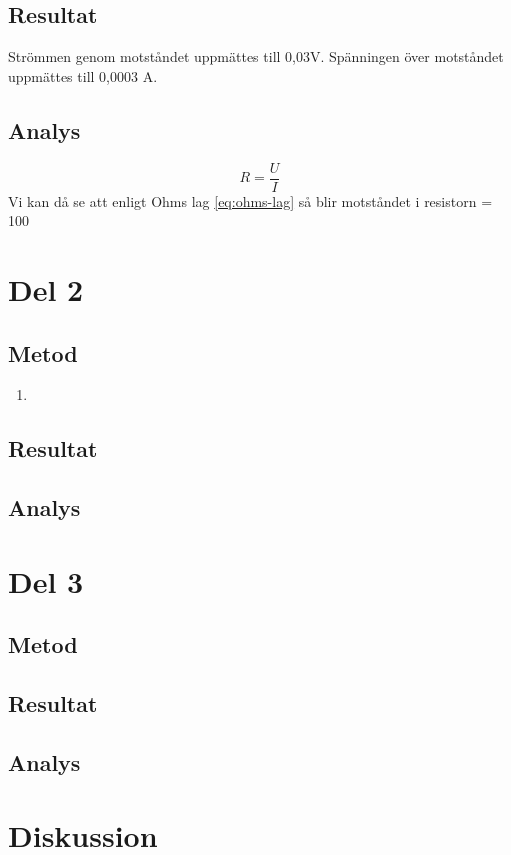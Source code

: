 \documentclass[11p]{article}
\begin{document}
    \subsection{Resultat}
        Strömmen genom motståndet uppmättes till 0,03V.
    \linebreak
        Spänningen över motståndet uppmättes till 0,0003 A.

    \subsection{Analys}
        \begin{equation}
            R=\frac{U}{I}
            \label{eq:ohms-lag}
        \end{equation}
        Vi kan då se att enligt Ohms lag \ref{eq:ohms-lag} så blir
        motståndet i resistorn  = 100\Omega

    \section{Del 2}
    \subsection{Metod}
        \begin{enumerate}
            \item
        \end{enumerate}
    \subsection{Resultat}

    \subsection{Analys}

    \section{Del 3}
    \subsection{Metod}
    \subsection{Resultat}
    \subsection{Analys}
    \section{Diskussion}
\end{document}
